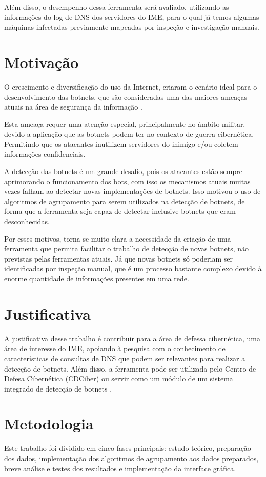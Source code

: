 Além disso, o desempenho dessa ferramenta será avaliado, utilizando as informações do log de DNS dos servidores do IME, para o qual já temos algumas máquinas infectadas previamente mapeadas por inspeção e investigação manuais.

\section{Motivação}
O crescimento e diversificação do uso da Internet, criaram o cenário ideal para o desenvolvimento das botnets, que são consideradas uma das maiores ameaças atuais na área de segurança da informação \citep{ji2008botnet}. 

Esta ameaça requer uma atenção especial, principalmente no âmbito militar, devido a aplicação que as botnets podem ter no contexto de guerra cibernética. Permitindo que os atacantes inutilizem servidores do inimigo e/ou coletem informações confidenciais.

A detecção das botnets é um grande desafio, pois os atacantes estão sempre aprimorando o funcionamento dos bots, com isso os mecanismos atuais muitas vezes falham ao detectar novas implementações de botnets. Isso motivou o uso de algoritmos de agrupamento para serem utilizados na detecção de botnets, de forma que a ferramenta seja capaz de detectar inclusive botnets que eram desconhecidas.

Por esses motivos, torna-se muito clara a necessidade da criação de uma ferramenta que permita facilitar o trabalho de detecção de novas botnets, não previstas pelas ferramentas atuais. Já que novas botnets só poderiam ser identificadas por inspeção manual, que é um processo bastante complexo devido à enorme quantidade de informações presentes em uma rede.

\section{Justificativa}
A justificativa desse trabalho é contribuir para a área de defessa cibernética, uma área de interesse do IME, apoiando à pesquisa com o conhecimento de características de consultas de DNS que podem ser relevantes para realizar a detecção de botnets. Além disso, a ferramenta pode ser utilizada pelo Centro de Defesa Cibernética (CDCiber) ou servir como um módulo de um sistema integrado de detecção de botnets \citep{silva2012arquitetura}.

\section{Metodologia}
Este trabalho foi dividido em cinco fases principais: estudo teórico, preparação dos dados, implementação dos algoritmos de agrupamento aos dados preparados, breve análise e testes dos resultados e implementação da interface gráfica. 

